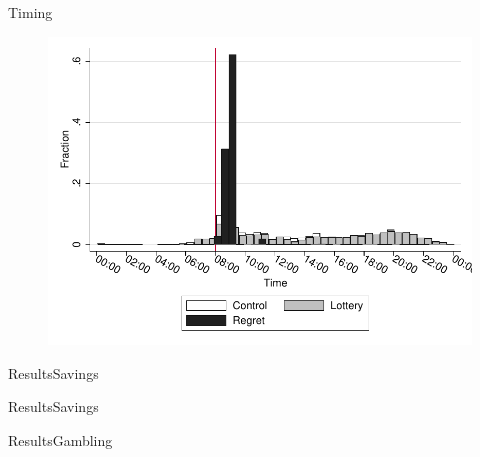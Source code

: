 \documentclass[aspectratio=169]{beamer}
\begin{document}
\begin{frame}{Timing}

	\begin{figure}[H]
		\centering
		\includegraphics[width=0.65\linewidth]{hist-deposits.pdf}
	\end{figure}

\end{frame}

\begin{frame}{Results}{Savings}

	

\end{frame}

\begin{frame}{Results}{Savings}

	

\end{frame}

\begin{frame}{Results}{Gambling}

	

\end{frame}
\end{document}
